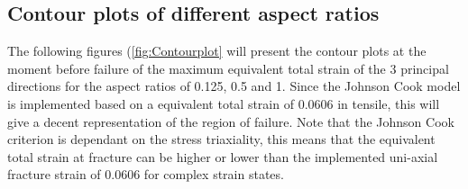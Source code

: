 \subsection{Contour plots of different aspect ratios }
The following figures (\ref{fig:Contourplot} will present the contour plots at the moment before failure of the maximum equivalent total strain of the 3 principal directions for the aspect ratios of 0.125, 0.5 and 1. Since the Johnson Cook model is implemented based on a equivalent total strain of 0.0606 in tensile, this will give a decent representation of the region of failure. Note that the Johnson Cook criterion is dependant on the stress triaxiality, this means that the equivalent total strain at fracture can be higher or lower than the implemented uni-axial fracture strain of 0.0606 for complex strain states.

